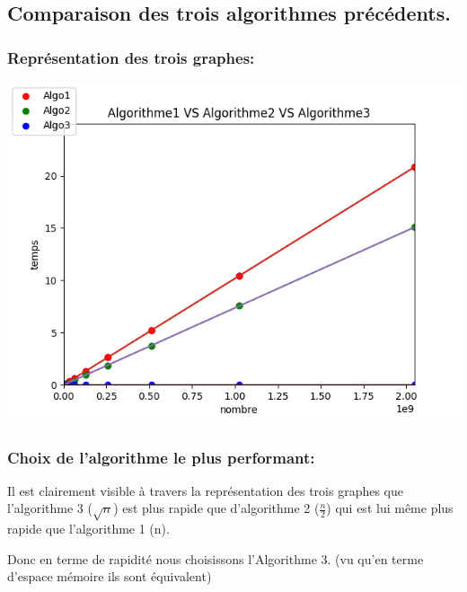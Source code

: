 \documentclass[12pt]{article}
\begin{document}
\subsection{Comparaison des trois algorithmes précédents.}
\subsubsection{Représentation des trois graphes:}

\includegraphics[width=1\textwidth]{graphe/Algorithme1_VS_Algorithme2_VS_Algorithme3.png}

\subsubsection{Choix de l'algorithme le plus performant:}
Il est clairement visible à travers la représentation des trois graphes que l'algorithme 3 ($\sqrt{n}$) est plus rapide que d'algorithme 2 ($\frac{n}{2}$) qui est lui même plus rapide que l'algorithme 1 (n).

Donc en terme de rapidité nous choisissons l'Algorithme 3.
(vu qu'en terme d'espace mémoire ils sont équivalent)
\end{document}
